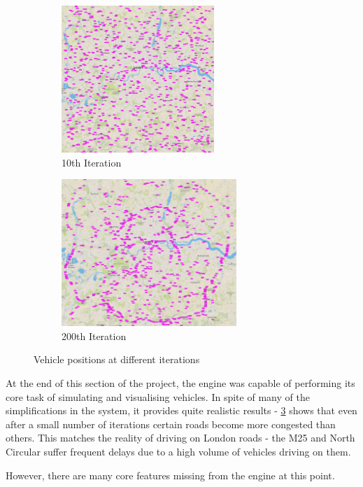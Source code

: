 \documentclass[ %
                    author={Alexander Hill},
                supervisor={Dr. Benjamin Sach},
                    degree={MEng},
                     title={MARMOSET},
                  subtitle={Multi-Agent Route Management using Online Simulation for Efficient Transportation},
                      type={research},
                      year={2016} ]{dissertation}
\begin{document}
\begin{figure}[h]
\centering
\begin{subfigure}[b]{0.4\textwidth}
    \centering
    \includegraphics[height=15em]{init-start}
    \caption{10th Iteration}\label{fig:init-start}
\end{subfigure}
\hspace{2em}
\begin{subfigure}[b]{0.4\textwidth}
    \centering
    \includegraphics[height=15em]{init-200}
    \caption{200th Iteration}\label{fig:init-200}
\end{subfigure}
\caption{Vehicle positions at different iterations}
\end{figure}

At the end of this section of the project, the engine was capable of performing
its core task of simulating and visualising vehicles. In spite of many of the
simplifications in the system, it provides quite realistic results -
\ref{fig:init-200} shows that even after a small number of iterations certain roads
become more congested than others. This matches the reality of driving on London
roads - the M25 and North Circular suffer frequent delays due to a high volume
of vehicles driving on them.

However, there are many core features missing from the engine at this point.
\end{document}
